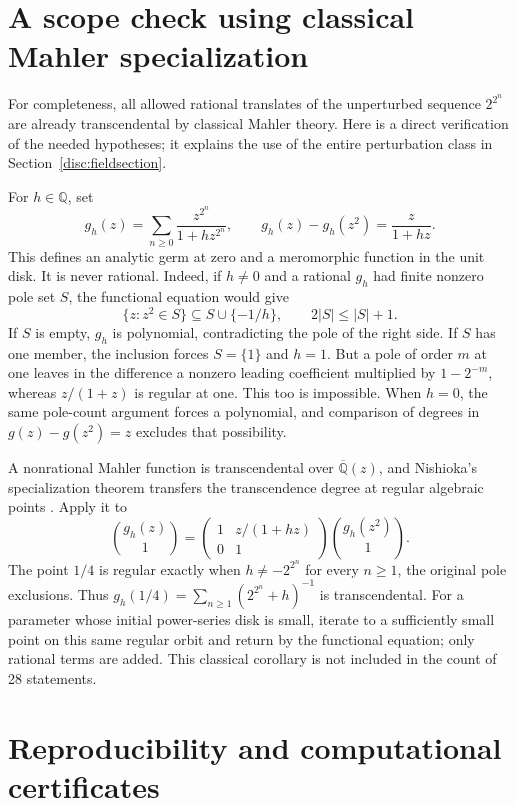 \documentclass[11pt,a4paper]{article}
\theoremstyle{definition}
\theoremstyle{remark}
\numberwithin{equation}{section}
\begin{document}
\appendix
\section{A scope check using classical Mahler specialization}
\label{app:mahler}

For completeness, all allowed rational translates of the unperturbed
sequence $2^{2^n}$ are already transcendental by classical Mahler
theory. Here is a direct verification of the needed hypotheses; it
explains the use of the entire perturbation class in
Section~\ref{disc:fieldsection}.

For $h\in\mathbb Q$, set
\[
 g_h(z)=\sum_{n\ge0}\frac{z^{2^n}}{1+h z^{2^n}},\qquad
 g_h(z)-g_h(z^2)=\frac{z}{1+hz}.
\]
This defines an analytic germ at zero and a meromorphic function in
the unit disk. It is never rational. Indeed, if $h\ne0$ and a
rational $g_h$ had finite nonzero pole set $S$, the functional equation
would give
\[
 \{z:z^2\in S\}\subseteq S\cup\{-1/h\},
 \qquad 2|S|\le |S|+1.
\]
If $S$ is empty, $g_h$ is polynomial, contradicting the pole of the
right side. If $S$ has one member, the inclusion forces $S=\{1\}$
and $h=1$. But a pole of order $m$ at one leaves in the difference a
nonzero leading coefficient multiplied by $1-2^{-m}$, whereas
$z/(1+z)$ is regular at one. This too is impossible. When $h=0$,
the same pole-count argument forces a polynomial, and comparison of
degrees in $g(z)-g(z^2)=z$ excludes that possibility.

A nonrational Mahler function is transcendental over
$\overline{\mathbb Q}(z)$, and Nishioka's specialization theorem
transfers the transcendence degree at regular algebraic points
\cite[Theorem~1]{AdamczewskiFaverjon2023}. Apply it to
\[
 \binom{g_h(z)}1=
 \begin{pmatrix}1&z/(1+hz)\\0&1\end{pmatrix}
 \binom{g_h(z^2)}1.
\]
The point $1/4$ is regular exactly when
$h\ne-2^{2^n}$ for every $n\ge1$, the original pole exclusions.
Thus $g_h(1/4)=\sum_{n\ge1}(2^{2^n}+h)^{-1}$ is transcendental.
For a parameter whose initial power-series disk is small, iterate to
a sufficiently small point on this same regular orbit and return by
the functional equation; only rational terms are added. This
classical corollary is not included in the count of 28 statements.

\section{Reproducibility and computational certificates}
\label{app:checks}
\end{document}
